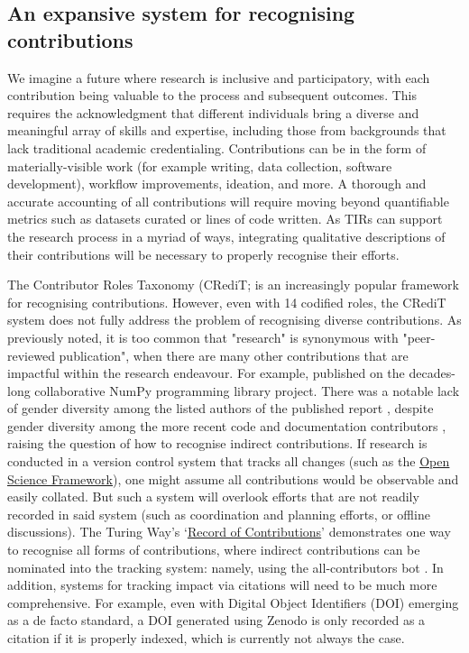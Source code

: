 \documentclass[authordate,meta,issue]{jote-new-article}
\begin{document}
\subsection{An expansive system for recognising contributions}



We imagine a future where research is inclusive and participatory, with each contribution being valuable to the process and subsequent outcomes. This requires the acknowledgment that different individuals bring a diverse and meaningful array of skills and expertise, including those from backgrounds that lack traditional academic credentialing. Contributions can be in the form of materially-visible work (for example writing, data collection, software development), workflow improvements, ideation, and more. A thorough and accurate accounting of all contributions will require moving beyond quantifiable metrics such as datasets curated or lines of code written. As TIRs can support the research process in a myriad of ways, integrating qualitative descriptions of their contributions will be necessary to properly recognise their efforts.



The Contributor Roles Taxonomy (CRediT; \parencites{Brand2015} is an increasingly popular framework for recognising contributions. However, even with 14 codified roles, the CRediT system does not fully address the problem of recognising diverse contributions. As previously noted, it is too common that "research" is synonymous with "peer-reviewed publication", when there are many other contributions that are impactful within the research endeavour. For example,  \textcites{Harris2020} published on the decades-long collaborative NumPy programming library project. There was a notable lack of gender diversity among the listed authors of the published report \parencites{Gallant2022}, despite gender diversity among the more recent code and documentation contributors \parencites{WeberMendonça2020}, raising the question of how to recognise indirect contributions. If research is conducted in a version control system that tracks all changes (such as the \href{https://osf.io}{\underline{Open Science Framework}}), one might assume all contributions would be observable and easily collated. But such a system will overlook efforts that are not readily recorded in said system (such as coordination and planning efforts, or offline discussions). The Turing Way's ‘\href{https://the-turing-way.netlify.app/afterword/contributors-record.html}{\underline{Record of Contributions}}' \parencites{TheTuringWayCommunityRecord2022} demonstrates one way to recognise all forms of contributions, where indirect contributions can be nominated into the tracking system: namely, using the all-contributors bot \parencites{Allall_2022}. In addition, systems for tracking impact via citations will need to be much more comprehensive. For example, even with Digital Object Identifiers (DOI) emerging as a de facto standard, a DOI generated using Zenodo is only recorded as a citation if it is properly indexed, which is currently not always the case.
\end{document}
